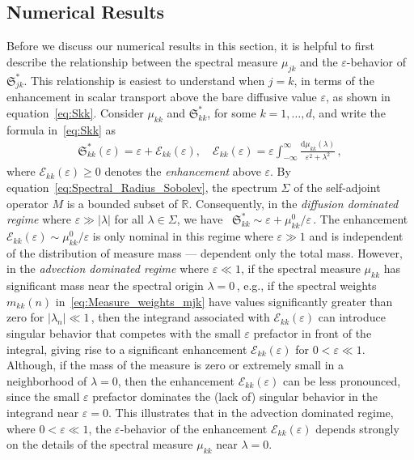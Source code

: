 \documentclass[english,12pt,jmp,graphicx]{revtex4-1}
\newcommand{\Sg}{\mathfrak{S}}
\renewcommand{\d}{\mathrm{d}}
\begin{document}
\subsection{Numerical Results}\label{sec:Numerical_RESULTS}
%
Before we discuss our numerical results in this section, it is
helpful to first describe the relationship between the spectral
measure $\mu_{jk}$ and the $\varepsilon$-behavior of
$\Sg_{jk}^*$. This relationship is easiest to understand when $j=k$,
in terms of the enhancement in scalar transport above the
bare diffusive
value $\varepsilon$, as shown in
equation~\eqref{eq:Skk}. Consider  $\mu_{kk}$ and $\Sg^*_{kk}$, for
some $k=1,\ldots,d$, and write the formula in~\eqref{eq:Skk} as   
%
\begin{align}\label{eq:Enhancement}
\Sg^*_{kk}(\varepsilon)=\varepsilon  + \mathcal{E}_{kk}(\varepsilon),
\quad
\mathcal{E}_{kk}(\varepsilon)
=\varepsilon\int_{-\infty}^\infty
\frac{\d\mu_{kk}(\lambda)}{\varepsilon^2+\lambda^2}\,, 
\end{align}
%
where $\mathcal{E}_{kk}(\varepsilon)\ge0$ denotes the \emph{enhancement} above
$\varepsilon$. 
By equation~\eqref{eq:Spectral_Radius_Sobolev}, the spectrum $\Sigma$
of the self-adjoint operator $M$ is a bounded subset of
$\mathbb{R}$. Consequently, in the \emph{diffusion dominated regime}
where $\varepsilon\gg|\lambda|$ for all $\lambda\in\Sigma$, we
have~\cite{Folland:99:RealAnalysis} 
$\Sg^*_{kk}\sim \varepsilon +\mu_{kk}^0/\varepsilon\,.$ The enhancement
$\mathcal{E}_{kk}(\varepsilon)\sim\mu_{kk}^0/\varepsilon$ is only nominal
in this regime where $\varepsilon\gg1$ and is independent of the
distribution of measure mass --- dependent only the total mass.
However, in the
\emph{advection dominated regime} where  $\varepsilon\ll1$, if the
spectral measure $\mu_{kk}$ has significant mass near the spectral
origin $\lambda=0\,$, e.g., if the spectral weights $m_{kk}(n)$
in~\eqref{eq:Measure_weights_mjk} have values significantly greater
than zero for
$|\lambda_n|\ll1\,$, then the integrand associated with
$\mathcal{E}_{kk}(\varepsilon)$ can introduce singular behavior that
competes with the small $\varepsilon$ prefactor in front of the
integral, giving rise to a significant
enhancement $\mathcal{E}_{kk}(\varepsilon)$ for
$0<\varepsilon\ll1$. Although, if the 
mass of the measure is zero or extremely small in a neighborhood of
$\lambda=0$, then the enhancement $\mathcal{E}_{kk}(\varepsilon)$ can be less
pronounced, since the small $\varepsilon$ prefactor dominates the
(lack of) singular behavior in the integrand near $\varepsilon=0$. This
illustrates that in the advection dominated regime, where
$0<\varepsilon\ll1$, the $\varepsilon$-behavior of the enhancement
$\mathcal{E}_{kk}(\varepsilon)$ depends strongly on the details of the
spectral measure 
$\mu_{kk}$ near $\lambda=0$.
\end{document}
